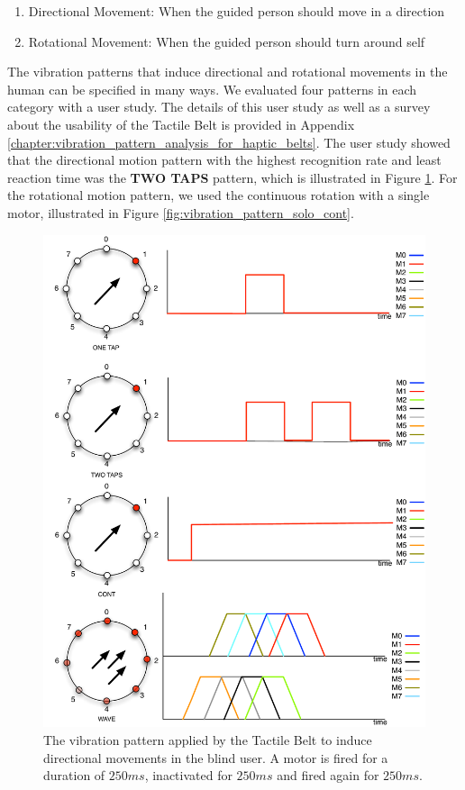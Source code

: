 \begin{enumerate}
\item Directional Movement: When the guided person should move in a direction
\item Rotational Movement: When the guided person should turn around self
\end{enumerate}

The vibration patterns that induce directional and rotational movements in the human can be specified in many ways. We evaluated four patterns in each category with a user study. The details of this user study as well as a survey about the usability of the Tactile Belt is provided in Appendix \ref{chapter:vibration_pattern_analysis_for_haptic_belts}. The user study showed that the directional motion pattern with the highest recognition rate and least reaction time was the \textbf{TWO TAPS} pattern, which is illustrated in Figure \ref{fig:vibration_pattern_two_taps}. For the rotational motion pattern, we used the continuous rotation with a single motor, illustrated in Figure \ref{fig:vibration_pattern_solo_cont}. 

\begin{figure}[ht!]
\centering
\includegraphics[width=1.0\textwidth]{pics/vibration_pattern_two_taps}
\caption{The vibration pattern applied by the Tactile Belt to induce directional movements in the blind user. A motor is fired for a duration of $250ms$, inactivated for $250ms$ and fired again for $250ms$.}
\label{fig:vibration_pattern_two_taps}
\end{figure}

